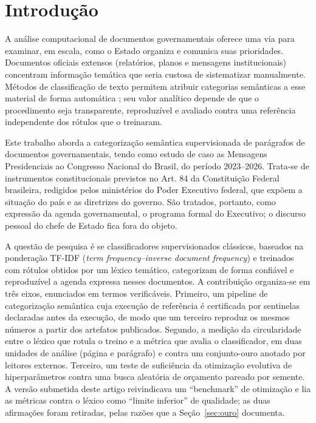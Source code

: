 \documentclass[fleqn,10pt]{SelfArx}
\affiliation{\textsuperscript{1}\textit{Programa de Pós-Graduação em Engenharia Elétrica (PPGEELT), Universidade Federal de Uberlândia (UFU), Uberlândia, MG, Brasil}}
\affiliation{*\textbf{Autor correspondente}: ferdinand.rafols@ufu.br}
\begin{document}
\setcounter{page}{1}
\flushbottom
\maketitle
\thispagestyle{empty}

\section{Introdução}

A análise computacional de documentos governamentais oferece uma via para examinar, em escala, como o Estado organiza e comunica suas prioridades. Documentos oficiais extensos (relatórios, planos e mensagens institucionais) concentram informação temática que seria custosa de sistematizar manualmente. Métodos de classificação de texto permitem atribuir categorias semânticas a esse material de forma automática \cite{jurafsky2025slp}; seu valor analítico depende de que o procedimento seja transparente, reproduzível e avaliado contra uma referência independente dos rótulos que o treinaram.

Este trabalho aborda a categorização semântica supervisionada de parágrafos de documentos governamentais, tendo como estudo de caso as Mensagens Presidenciais ao Congresso Nacional do Brasil, do período 2023--2026. Trata-se de instrumentos constitucionais previstos no Art. 84 da Constituição Federal brasileira, redigidos pelos ministérios do Poder Executivo federal, que expõem a situação do país e as diretrizes do governo. São tratados, portanto, como expressão da agenda governamental, o programa formal do Executivo; o discurso pessoal do chefe de Estado fica fora do objeto.

A questão de pesquisa é se classificadores supervisionados clássicos, baseados na ponderação TF-IDF (\textit{term frequency--inverse document frequency}) e treinados com rótulos obtidos por um léxico temático, categorizam de forma confiável e reproduzível a agenda expressa nesses documentos. A contribuição organiza-se em três eixos, enunciados em termos verificáveis. Primeiro, um pipeline de categorização semântica cuja execução de referência é certificada por sentinelas declaradas antes da execução, de modo que um terceiro reproduz os mesmos números a partir dos artefatos publicados. Segundo, a medição da circularidade entre o léxico que rotula o treino e a métrica que avalia o classificador, em duas unidades de análise (página e parágrafo) e contra um conjunto-ouro anotado por leitores externos. Terceiro, um teste de suficiência da otimização evolutiva de hiperparâmetros contra uma busca aleatória de orçamento pareado por semente. A versão submetida deste artigo reivindicava um ``benchmark'' de otimização e lia as métricas contra o léxico como ``limite inferior'' de qualidade; as duas afirmações foram retiradas, pelas razões que a Seção~\ref{sec:ouro} documenta.
\end{document}
